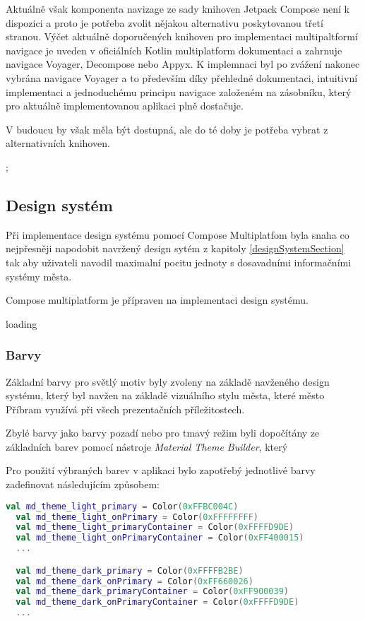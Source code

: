 Aktuálně však komponenta navizage ze sady knihoven Jetpack Compose není k dispozici a proto je potřeba zvolit nějakou alternativu poskytovanou
třetí stranou. \cite{composeNav} Výčet aktuálně doporučených knihoven pro implementaci multipaltformí navigace je uveden v oficiálních Kotlin 
multiplatform dokumentaci a zahrnuje navigace Voyager, Decompose nebo Appyx. K implemnaci byl po zvážení nakonec vybrána navigace Voyager a 
to především díky přehledné dokumentaci, intuitivní implementaci a jednoduchému principu navigace založeném na zásobníku, který pro aktuálně
implementovanou aplikaci plně dostačuje.

V budoucu by však měla být dostupná, ale do té doby je potřeba vybrat z alternativních knihoven.


;
\subsection{Design systém}

Při implementace design systému pomocí Compose Multiplatfom byla snaha co nejpřesněji napodobit navržený design sytém z kapitoly \ref{designSystemSection}
tak aby uživateli navodil maximalní pocitu jednoty s dosavadními informačními systémy města.


Compose multiplatform je přípraven na implementaci design systému. 

loading


\subsubsection*{Barvy} \label{colorSection}
Základní barvy pro světlý motiv byly zvoleny na základě navženého design systému, který byl navžen na základě vizuálního stylu města, které město 
Příbram využívá při všech prezentačních příležitostech.

Zbylé barvy jako barvy pozadí nebo pro tmavý režim byli dopočítány ze základních barev pomocí nástroje \textit{Material Theme Builder}, který 

Pro použití výbraných barev v aplikaci bylo zapotřebý jednotlivé barvy zadefinovat následujícím způsobem:

\begin{lstlisting}[caption={Zadefinování barev}, label={lst:ComposeCode}, language=Kotlin]
  val md_theme_light_primary = Color(0xFFBC004C)
  val md_theme_light_onPrimary = Color(0xFFFFFFFF)
  val md_theme_light_primaryContainer = Color(0xFFFFD9DE)
  val md_theme_light_onPrimaryContainer = Color(0xFF400015)
  ...

  val md_theme_dark_primary = Color(0xFFFFB2BE)
  val md_theme_dark_onPrimary = Color(0xFF660026)
  val md_theme_dark_primaryContainer = Color(0xFF900039)
  val md_theme_dark_onPrimaryContainer = Color(0xFFFFD9DE)
  ...
\end{lstlisting}

